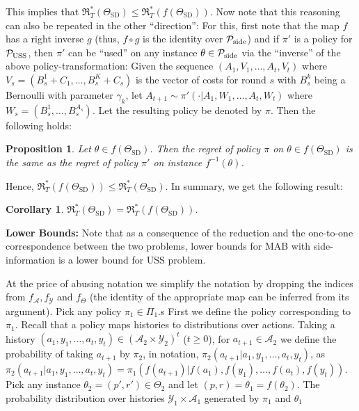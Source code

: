 \documentclass[11pt]{article} %
\newcommand{\todoc}[2][]{\todo[color=Apricot!20,size=\tiny,#1]{Cs: #2}}
\newcommand{\SD}{\mathrm{SD}}
\newcommand{\TSD}{\Theta_{\SD}}
\newcommand{\Y}{\mathcal{Y}}
\newcommand{\A}{\mathcal{A}}
\newcommand{\Regret}{\mathfrak{R}}
\newtheorem{prop}{Proposition}
\newtheorem{cor}{Corollary}
\begin{document}
This implies that $\Regret_T^*(\TSD)\le \Regret_T^*(f(\TSD))$. Now note that this reasoning can also be repeated in the other ``direction'': 
For this, first note that the map $f$ has a right inverse $g$ 
(thus, $f\circ g$ is the identity over $\mathcal{P}_{\mathrm{side}}$)
and if $\pi'$ is a policy for $\mathcal{P}_{\mathrm{USS}}$, 
then $\pi'$ can be ``used''  on any instance $\theta\in \mathcal{P}_{\mathrm{side}}$
via the ``inverse'' of the above policy-transformation:
Given the sequence $(A_1,V_1,\dots,A_t,V_t)$ where 
$V_s= (B_s^1+C_1,\dots,B_ s^{K}+C_s)$ is the vector of costs for round $s$
with $B_s^k$ being a Bernoulli with parameter $\gamma_k$,
let $A_{t+1} \sim \pi'( \cdot| A_1,W_1,\dots,A_t,W_t)$ where
$W_s = (B_s^1,\dots,B_s^{A_s})$. Let the resulting policy be denoted by $\pi$.
Then the following holds:
\begin{prop}
Let $\theta \in f(\TSD)$. Then the regret of policy $\pi$ on $\theta\in f(\TSD)$ is the same
as the regret of policy $\pi'$ on instance $f^{-1}(\theta)$.
\end{prop}
Hence, $\Regret_T^*(f(\TSD))\le \Regret_T^*(\TSD)$.
In summary, we get the following result:
\begin{cor}
$\Regret_T^*(\TSD) = \Regret_T^*(f(\TSD))$. 
\end{cor}
{\bf Lower Bounds:} Note that as a consequence of the reduction and the one-to-one correspondence between the two problems, lower bounds for MAB with side-information is a lower bound for USS problem.



At the price of abusing notation 
we simplify the notation by dropping the indices from $f_{\A}, f_{\Y}$ and $f_{\Theta}$ (the identity of the appropriate map can be inferred from its argument).
Pick any policy $\pi_1\in \Pi_1$.s
First we define the policy corresponding to $\pi_1$.
Recall that a policy maps histories to distributions over actions.
Taking a history $(a_1,y_1,\dots,a_t,y_t)\in (\A_2\times \Y_2)^t$ ($t\ge 0$),
for $a_{t+1}\in \A_2$ we define the probability of taking $a_{t+1}$ by $\pi_2$, in notation,
 $\pi_2(a_{t+1}|a_1,y_1,\dots,a_t,y_t)$, as
 $\pi_2(a_{t+1}|a_1,y_1,\dots,a_t,y_t) = \pi_1(f(a_{t+1})|f(a_1),f(y_1),\dots,f(a_t),f(y_t))$.
Pick any instance $\theta_2 = (p',r')\in \Theta_2$ and let $(p,r) = \theta_1  = f( \theta_2)$.
The probability distribution over histories $\Y_1 \times \A_1$ generated by $\pi_1$ and $\theta_1$
\fi
\end{document}
